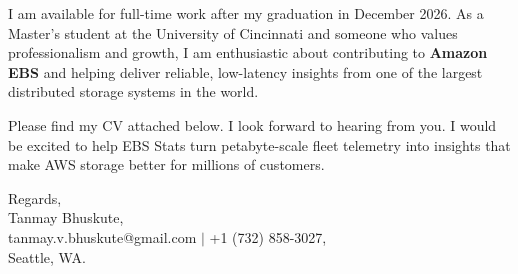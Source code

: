 \documentclass[11pt]{letter}
\begin{document}
\begin{letter}{}
I am available for full-time work after my graduation in December 2026. As a Master's student at the University of Cincinnati and someone who values professionalism and growth, I am enthusiastic about contributing to \textbf{Amazon EBS} and helping deliver reliable, low-latency insights from one of the largest distributed storage systems in the world.

Please find my CV attached below. I look forward to hearing from you. I would be excited to help EBS Stats turn petabyte-scale fleet telemetry into insights that make AWS storage better for millions of customers.

{\setlength{\parskip}{0pt}
Regards,\\
Tanmay Bhuskute,\\
tanmay.v.bhuskute@gmail.com $\mid$ +1 (732) 858-3027,\\
Seattle, WA.
}

\end{letter}
\end{document}
